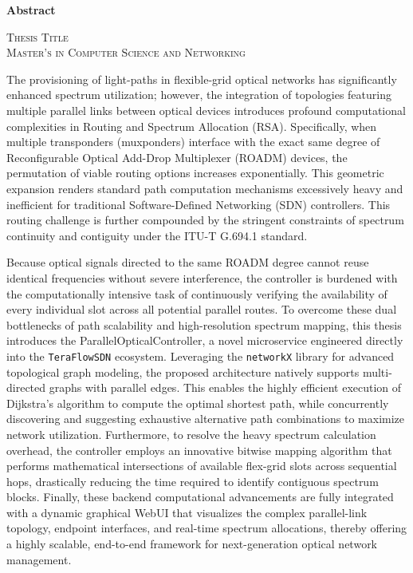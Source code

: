 \documentclass[fontsize=14pt,a4paper,DIV=14,open=any]{scrreprt}
\renewcommand{\abstractname}{Abstract}
\renewenvironment{abstract}{%
  \clearpage\null\vfill
  \begin{center}
    {\Huge\bfseries\abstractname}
  \end{center}
  \vspace{1em}
  \par\noindent\ignorespaces
}{\par\vfill\null\clearpage}
\begin{document}
\begin{abstract}
    \begin{center}
        \textsc{\large Thesis Title}\\[0.2cm]
        \textsc{\large Master's in Computer Science and Networking}\\[1cm]
    \end{center}
    The provisioning of light-paths in flexible-grid optical networks has significantly enhanced spectrum utilization; however, the integration of topologies featuring multiple parallel links between optical devices introduces profound computational complexities in Routing and Spectrum Allocation (RSA). Specifically, when multiple transponders (muxponders) interface with the exact same degree of Reconfigurable Optical Add-Drop Multiplexer (ROADM) devices, the permutation of viable routing options increases exponentially. This geometric expansion renders standard path computation mechanisms excessively heavy and inefficient for traditional Software-Defined Networking (SDN) controllers. This routing challenge is further compounded by the stringent constraints of spectrum continuity and contiguity under the ITU-T G.694.1 standard.

    Because optical signals directed to the same ROADM degree cannot reuse identical frequencies without severe interference, the controller is burdened with the computationally intensive task of continuously verifying the availability of every individual slot across all potential parallel routes. To overcome these dual bottlenecks of path scalability and high-resolution spectrum mapping, this thesis introduces the ParallelOpticalController, a novel microservice engineered directly into the \texttt{TeraFlowSDN} ecosystem. Leveraging the \texttt{networkX} library for advanced topological graph modeling, the proposed architecture natively supports multi-directed graphs with parallel edges. This enables the highly efficient execution of Dijkstra's algorithm to compute the optimal shortest path, while concurrently discovering and suggesting exhaustive alternative path combinations to maximize network utilization. Furthermore, to resolve the heavy spectrum calculation overhead, the controller employs an innovative bitwise mapping algorithm that performs mathematical intersections of available flex-grid slots across sequential hops, drastically reducing the time required to identify contiguous spectrum blocks. Finally, these backend computational advancements are fully integrated with a dynamic graphical WebUI that visualizes the complex parallel-link topology, endpoint interfaces, and real-time spectrum allocations, thereby offering a highly scalable, end-to-end framework for next-generation optical network management.
\end{abstract}
\tableofcontents
\listoffigures
\listoftables







\printbibliography
\end{document}

